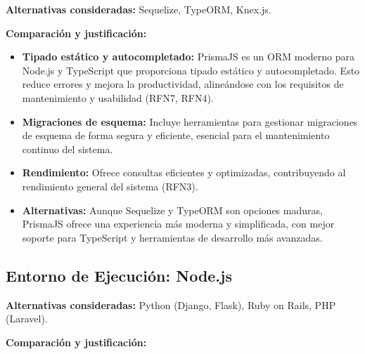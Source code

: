 \textbf{Alternativas consideradas:} Sequelize, TypeORM, Knex.js.

\textbf{Comparación y justificación:}

\begin{itemize} 
	\item \textbf{Tipado estático y autocompletado:} PrismaJS es un ORM moderno para Node.js y TypeScript que proporciona tipado estático y autocompletado. Esto reduce errores y mejora la productividad, alineándose con los requisitos de mantenimiento y usabilidad (RFN7, RFN4).
	
	\item \textbf{Migraciones de esquema:} Incluye herramientas para gestionar migraciones de esquema de forma segura y eficiente, esencial para el mantenimiento continuo del sistema.
	
	\item \textbf{Rendimiento:} Ofrece consultas eficientes y optimizadas, contribuyendo al rendimiento general del sistema (RFN3).
	
	\item \textbf{Alternativas:} Aunque Sequelize y TypeORM son opciones maduras, PrismaJS ofrece una experiencia más moderna y simplificada, con mejor soporte para TypeScript y herramientas de desarrollo más avanzadas.
	
\end{itemize}

\subsection{Entorno de Ejecución: Node.js}

\textbf{Alternativas consideradas:} Python (Django, Flask), Ruby on Rails, PHP (Laravel).

\textbf{Comparación y justificación:}

